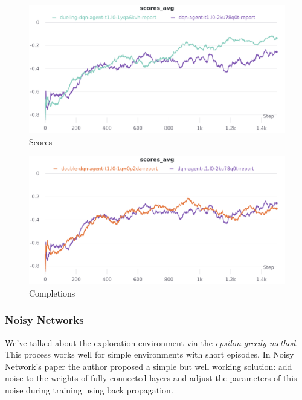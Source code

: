 \documentclass[12pt]{article}
\begin{document}
\begin{figure}[H]
        \centerline{\includegraphics[scale=.2]{res/charts/dueling_scores.png}}
        \caption{Scores}
\end{figure}

\begin{figure}[H]
        \centerline{\includegraphics[scale=.2]{res/charts/dueling_completions.png}}
        \caption{Completions}
\end{figure}


\subsubsection{Noisy Networks}
We've talked about the exploration environment via the \textit{epsilon-greedy method}. This process works well for simple environments with short episodes. In Noisy Network's paper \cite{noisy-dqn} the author proposed a simple but well working solution: add noise to the weights of fully connected layers and adjust the parameters of this noise during training using back propagation.  
\end{document}
